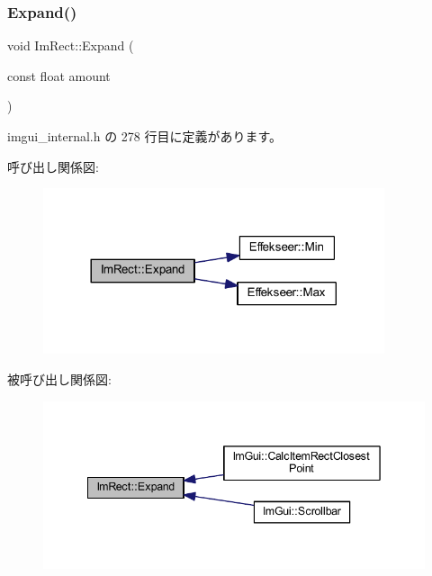 \subsubsection{\texorpdfstring{Expand()}{Expand()}\hspace{0.1cm}{\footnotesize\ttfamily [1/2]}}
{\footnotesize\ttfamily void Im\+Rect\+::\+Expand (\begin{DoxyParamCaption}\item[{const float}]{amount }\end{DoxyParamCaption})\hspace{0.3cm}{\ttfamily [inline]}}



 imgui\+\_\+internal.\+h の 278 行目に定義があります。

呼び出し関係図\+:\nopagebreak
\begin{figure}[H]
\begin{center}
\leavevmode
\includegraphics[width=284pt]{struct_im_rect_af33a7424c3341d08acd69da30c27c753_cgraph}
\end{center}
\end{figure}
被呼び出し関係図\+:\nopagebreak
\begin{figure}[H]
\begin{center}
\leavevmode
\includegraphics[width=342pt]{struct_im_rect_af33a7424c3341d08acd69da30c27c753_icgraph}
\end{center}
\end{figure}
\mbox{\label{struct_im_rect_ac0b0b88fe65725b4694cd7d91d42d382}} 
